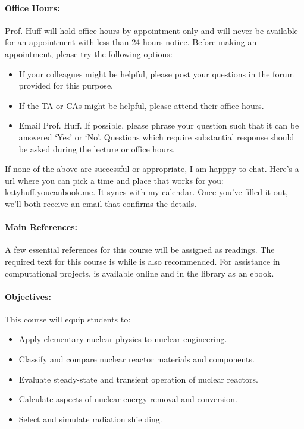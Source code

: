\documentclass[11pt, a4paper]{article}
\begin{document}
\paragraph{Office Hours:} Prof. Huff will hold office hours by appointment only 
and will never be available for an appointment with less than 24 hours notice. 
Before making an appointment, please try the following options:
\begin{itemize}
\item If your colleagues might be helpful, please post your questions in the 
        forum provided for this purpose. 
\item If the TA or CAs might be helpful, please attend their office hours.
\item Email Prof. Huff. If possible, please phrase your question such that it 
        can be answered `Yes' or `No'.  Questions which require substantial 
        response should be asked during the lecture or office hours.
\end{itemize}

If none of the above are successful or appropriate, I am happpy to chat. 
Here's a url where you can pick a time and place that works for you: 
\href{http://katyhuff.youcanbook.me}{katyhuff.youcanbook.me}. It syncs with my 
calendar. Once you've filled it out, we'll both receive an email that confirms 
the details.

\paragraph{Main References:}
A few essential references for this course will be assigned as readings. The 
required text for this course is \cite{shultis_fundamentals_2016} while 
\cite{lamarsh_introduction_2017} is also recommended. For assistance in 
computational projects, \cite{scopatz_effective_2015} is available online and 
in the library as an ebook.


\renewcommand{\refname}{\normalfont\selectfont\normalsize}\vspace{-1cm} 


\paragraph{Objectives:} 

This course will equip students to:

\begin{itemize}
\item Apply elementary nuclear physics to nuclear engineering. 
\item Classify and compare nuclear reactor materials and components.
\item Evaluate steady-state and transient operation of nuclear reactors.
\item Calculate aspects of nuclear energy removal and conversion.
\item Select and simulate radiation shielding.
\end{itemize}
\end{document}
